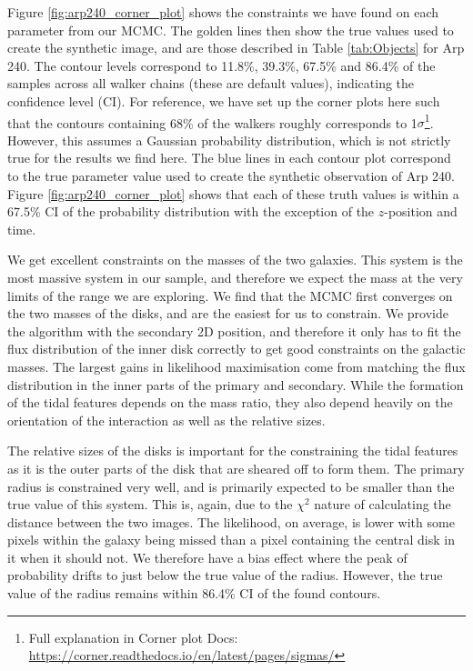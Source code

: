 Figure \ref{fig:arp240_corner_plot} shows the constraints we have found on each parameter from our MCMC. The golden lines then show the true values used to create the synthetic image, and are those described in Table \ref{tab:Objects} for Arp 240. The contour levels correspond to 11.8\%, 39.3\%, 67.5\% and 86.4\% of the samples across all walker chains (these are default values), indicating the confidence level (CI). For reference, we have set up the corner plots here such that the contours containing 68\% of the walkers roughly corresponds to 1$\sigma$\footnote{Full explanation in Corner plot Docs: \url{https://corner.readthedocs.io/en/latest/pages/sigmas/}}. However, this assumes a Gaussian probability distribution, which is not strictly true for the results we find here. The blue lines in each contour plot correspond to the true parameter value used to create the synthetic observation of Arp 240. Figure \ref{fig:arp240_corner_plot} shows that each of these truth values is within a 67.5\% CI of the probability distribution with the exception of the $z$-position and time.

We get excellent constraints on the masses of the two galaxies. This system is the most massive system in our sample, and therefore we expect the mass at the very limits of the range we are exploring. We find that the MCMC first converges on the two masses of the disks, and are the easiest for us to constrain. We provide the algorithm with the secondary 2D position, and therefore it only has to fit the flux distribution of the inner disk correctly to get good constraints on the galactic masses. The largest gains in likelihood maximisation come from matching the flux distribution in the inner parts of the primary and secondary. While the formation of the tidal features depends on the mass ratio, they also depend heavily on the orientation of the interaction as well as the relative sizes.

The relative sizes of the disks is important for the constraining the tidal features as it is the outer parts of the disk that are sheared off to form them. The primary radius is constrained very well, and is primarily expected to be smaller than the true value of this system. This is, again, due to the $\chi^{2}$ nature of calculating the distance between the two images. The likelihood, on average, is lower with some pixels within the galaxy being missed than a pixel containing the central disk in it when it should not. We therefore have a bias effect where the peak of probability drifts to just below the true value of the radius. However, the true value of the radius remains within 86.4\% CI of the found contours. 

